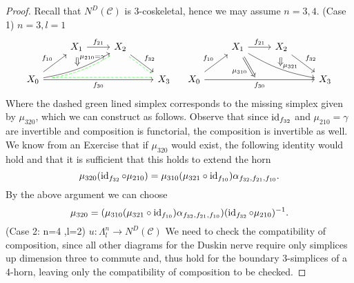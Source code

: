 \begin{proof}
	Recall that $ N^D ( \mathcal{ C } ) $ is 3-coskeletal, hence we may assume $ n = 3 , 4 $.
	(Case 1) $ n = 3 , l = 1 $ 
	\[
	\begin{tikzcd}
		&
		X_1
		\ar[r , " f_{ 2 1 } " ]
		&
		X_2
		\ar[rd, "f_{ 3 2 } "]
		\ar[rd, green, dash, dashed, shift right]
		\\
		X_0
		\ar[rrr, green, dash, dashed, shift left,
			start anchor={[xshift=2ex]}]
		\ar[rru,bend right=10,""{name=U, below}]
		\ar[rru, green, dash, dashed, shift right, bend right=10, 
		start anchor={[xshift=2ex]},
		start anchor={[yshift=0.5ex]}]
		\ar[ru, " f_{ 1 0 } " ]
		\ar[rrr, " f_{ 3 0 } "']
		\arrow[Rightarrow, from=ru, to=U, shorten=3, "\mu_{ 2 1 0 } = \gamma"]
		&&&
		X_3
	\end{tikzcd}
	\quad
	\begin{tikzcd}
		&
		X_1
		\ar[r , " f_{ 2 1 } " ]
		\ar[rrd, bend right=10,""{name=D, below}]
		&
		X_2
		\ar[rd, "f_{ 3 2 } "]
		\ar[Rightarrow, to=D, shorten = 3, "\mu_{ 3 2 1 } "]
		\\
		X_0
		\ar[ru, " f_{ 1 0 } " ]
		\ar[rrr, " f_{ 3 0 } "' {name=L, below}]
		\ar[Rightarrow, from=ur, to=L, shorten = 3, "\mu_{ 3 1 0 } "']
		&&&
		X_3
	\end{tikzcd}
	\]
	Where the dashed green lined simplex corresponds to the missing simplex given by $ \mu_{ 3 2 0 } $, which we can construct as follows.
	Observe that since $ \operatorname{id}_{ f_ { 3 2 } } $ and $ \mu_{ 2 1 0 } = \gamma $ are invertible and composition is functorial, the composition is invertible as well. 
	We know from an Exercise that if $ \mu_{ 3 2 0 } $ would exist, the following identity would hold and that it is sufficient that this holds to extend the horn
	\[
		\mu_{ 3 2 0 } ( \operatorname{id}_{ f_ { 3 2 } }  \circ \mu_{ 2 1 0 } ) 
		=
		\mu_{ 3 1 0 } ( \mu_{ 3 2 1 } \circ \operatorname{id}_{ f_{ 1 0 } } ) \alpha_{ f_{ 3 2 } , f_{ 2 1 } , f_{ 1 0 } } .
	\]
	By the above argument we can choose
	\[
		\mu_{ 3 2 0 } 
		=
		( \mu_{ 3 1 0 } ( \mu_{ 3 2 1 } \circ \operatorname{id}_{ f_{ 1 0 } } ) \alpha_{ f_{ 3 2 } , f_{ 2 1 } , f_{ 1 0 } } )  ( \operatorname{id}_{ f_ { 3 2 } } \circ \mu_{ 2 1 0 } )^{ - 1 }.
	\]
	\newline
	(Case 2: n=4 ,l=2) $ u \colon \Lambda_l^n \to N^D ( \mathcal{ C } ) $
	\newline
	We need to check the compatibility of composition, since all other diagrams for the Duskin nerve require only simplices up dimension three to commute and, thus hold for the boundary 3-simplices of a 4-horn, leaving only the compatibility of composition to be checked.

\end{proof}
